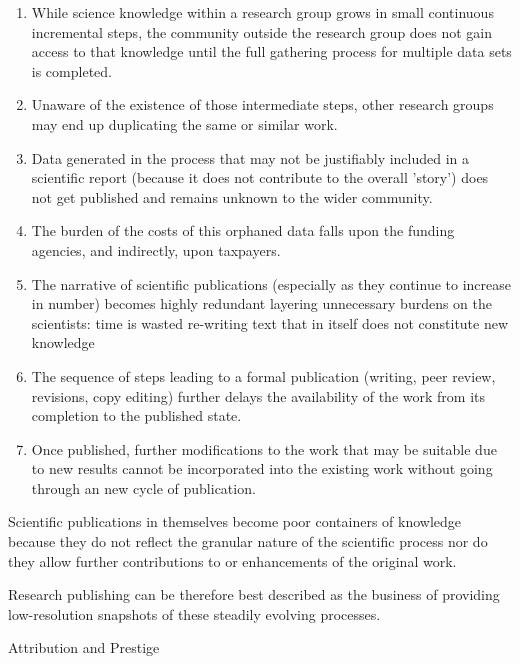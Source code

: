\documentclass[final,authoryear,3p]{elsarticle-open-drafting}
\begin{document}
\begin{enumerate}
\item While science knowledge within a research group grows in small continuous incremental steps, the community outside the research group does not gain access to that knowledge until the full gathering process for multiple data sets is completed. 
\item Unaware of the existence of those intermediate steps, other research groups may end up duplicating the same or similar work. 
\item Data generated in the process that may not be justifiably included in a scientific report (because it does not contribute to the overall 'story') does not get published and remains unknown to the wider community. 
\item The burden of the costs of this orphaned data falls upon the funding agencies, and indirectly, upon taxpayers. 
\item The narrative of scientific publications (especially as they continue to increase in number) becomes highly redundant layering unnecessary burdens on the scientists: time is wasted re-writing text that in itself does not constitute new knowledge
\item The sequence of steps leading to a formal publication (writing, peer review, revisions, copy editing) further delays the availability of the work from its completion to the published state. %
\item Once published, further modifications to the work that may be suitable due to new results cannot be incorporated into the existing work without going through an new cycle of publication. 
\end{enumerate}

Scientific publications in themselves become poor containers of knowledge because they do not reflect the granular nature of the scientific process nor do they allow further contributions to or enhancements of the original work. 

Research publishing can be therefore best described as the business of providing low-resolution snapshots of these steadily evolving processes. 

Attribution and Prestige
\end{document}
